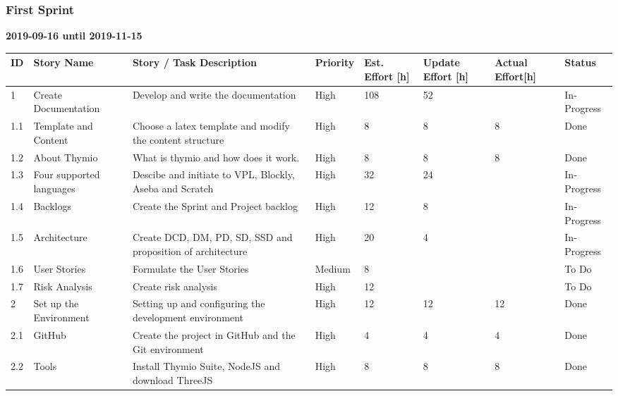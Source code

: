\documentclass{scrartcl}
\begin{document}
\subsubsection{First Sprint}
\textbf{2019-09-16 until 2019-11-15}
\begin{table}[]
  \begin{tabular}{l|l|l|l|l|l|l|l}
  ID                     & Story Name & Story / Task Description & Priority & Est. Effort {[}h{]} & Update Effort {[}h{]} & Actual Effort{[}h{]} & Status                \\ \hline
  \multicolumn{1}{|l|}{1} & Create Documentation & Develop and write the documentation & High & 108 & 52 &  & \multicolumn{1}{l|}{In-Progress} \\ \hline
  \multicolumn{1}{|l|}{1.1} & Template and Content & Choose a latex template and modify the content structure & High & 8 & 8 & 8 & \multicolumn{1}{l|}{Done} \\ \hline
  \multicolumn{1}{|l|}{1.2} & About Thymio & What is thymio and how does it work. & High & 8 & 8 & 8 & \multicolumn{1}{l|}{Done} \\ \hline
  \multicolumn{1}{|l|}{1.3} & Four supported languages & Descibe and initiate to VPL, Blockly, Aseba and Scratch & High & 32 & 24 &  & \multicolumn{1}{l|}{In-Progress} \\ \hline
  \multicolumn{1}{|l|}{1.4} & Backlogs & Create the Sprint and Project backlog & High & 12 & 8 &  & \multicolumn{1}{l|}{In-Progress} \\ \hline
  \multicolumn{1}{|l|}{1.5} & Architecture & Create DCD, DM, PD, SD, SSD and proposition of architecture & High & 20 & 4 &  & \multicolumn{1}{l|}{In-Progress} \\ \hline
  \multicolumn{1}{|l|}{1.6} & User Stories & Formulate the User Stories & Medium & 8 &  &  & \multicolumn{1}{l|}{To Do} \\ \hline
  \multicolumn{1}{|l|}{1.7} & Risk Analysis & Create risk analysis & High & 12 &  &  & \multicolumn{1}{l|}{To Do} \\ \hline
  \multicolumn{1}{|l|}{2} & Set up the Environment & Setting up and configuring the development environment & High & 12 & 12 & 12 & \multicolumn{1}{l|}{Done} \\ \hline
  \multicolumn{1}{|l|}{2.1} & GitHub & Create the project in GitHub and the Git environment & High & 4 & 4 & 4 & \multicolumn{1}{l|}{Done} \\ \hline
  \multicolumn{1}{|l|}{2.2} & Tools & Install Thymio Suite, NodeJS and download ThreeJS & High & 8 & 8 & 8 & \multicolumn{1}{l|}{Done} \\ \hline

\end{tabular}
\end{table}
\end{document}
